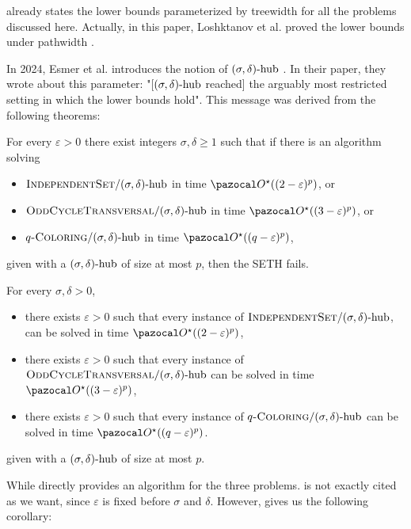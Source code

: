 \medskip

 already states the lower bounds parameterized by treewidth for all the problems discussed here. Actually, in this paper, Loshktanov et al. proved the lower bounds under pathwidth \cite{lokshtanov2011known}.

In 2024, Esmer et al. introduces the notion of $(\sigma, \delta)\text{-hub}$ \cite{esmer2024fundamental}. In their paper, they wrote about this parameter: "[$(\sigma, \delta)\text{-hub}$ reached] the arguably most restricted setting in which the lower bounds hold". This message was derived from the following theorems:

\begin{theorem}
    \label{theorem:sdhub-lowerbounds}
    For every $\varepsilon > 0$ there exist integers $\sigma, \delta \geq 1$ such that if there is an algorithm solving
    \begin{itemize}
        \item $\textsc{IndependentSet}/(\sigma, \delta)\text{-hub}$ in time $\O^\star((2 - \varepsilon)^p)$, or
        \item $\textsc{OddCycleTransversal}/(\sigma, \delta)\text{-hub}$ in time $\O^\star((3 - \varepsilon)^p)$, or
        \item $q\textsc{-Coloring}/(\sigma, \delta)\text{-hub}$ in time $\O^\star((q - \varepsilon)^p)$,
    \end{itemize}
    given with a $(\sigma, \delta)\text{-hub}$ of size at most $p$, then the SETH fails.
\end{theorem}

\begin{theorem}
    \label{theorem:sdhub-upperbounds}
    For every $\sigma, \delta > 0$, 
    \begin{itemize}
        \item there exists $\varepsilon > 0$ such that every instance of $\textsc{IndependentSet}/(\sigma, \delta)\text{-hub}$, can be solved in time $\O^\star((2 - \varepsilon)^p)$,
        \item there exists $\varepsilon > 0$ such that every instance of $\textsc{OddCycleTransversal}/(\sigma, \delta)\text{-hub}$ can be solved in time $\O^\star((3 - \varepsilon)^p)$,
        \item there exists $\varepsilon > 0$ such that every instance of $q\textsc{-Coloring}/(\sigma, \delta)\text{-hub}$ can be solved in time $\O^\star((q - \varepsilon)^p)$.
    \end{itemize}
    given with a $(\sigma, \delta)\text{-hub}$ of size at most $p$.
\end{theorem}

While  directly provides an algorithm for the three problems.  is not exactly cited as we want, since $\varepsilon$ is fixed before $\sigma$ and $\delta$. However,  gives us the following corollary:

